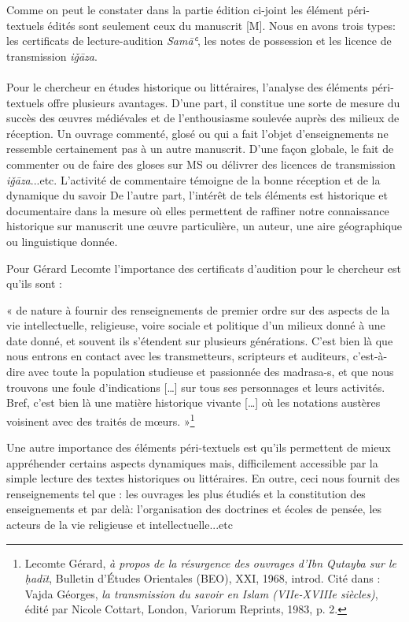 \documentclass[a4paper,12pt]{report}
\begin{document}
\begin{itemize}
\begin{enumerate}
Comme on peut le constater dans la partie édition ci-joint les élément péri-textuels édités sont seulement  ceux du manuscrit [M]. Nous en avons  trois types: les certificats de lecture-audition \textit{Samāʿ}, les notes de possession et les licence de transmission \textit{iǧāza}.  

\paragraph{}    
Pour le chercheur en études historique ou littéraires, l’analyse des éléments péri-textuels offre plusieurs avantages. D'une part, il constitue  une sorte de mesure du succès des œuvres médiévales et  de l’enthousiasme  soulevée auprès des milieux de réception. Un ouvrage commenté, glosé ou qui a fait l’objet d'enseignements  ne ressemble certainement pas à un autre manuscrit. D'une façon globale, le fait de commenter ou de faire des gloses sur MS ou délivrer des licences de transmission \textit{iǧāza}...etc. L'activité de commentaire  témoigne de la bonne réception et de la dynamique du savoir  De l’autre part, l’intérêt de tels  éléments est historique et documentaire dans la mesure où elles permettent de raffiner notre connaissance historique sur manuscrit une œuvre particulière, un auteur, une aire géographique ou linguistique donnée. 

Pour Gérard Lecomte  l’importance  des certificats d’audition  pour le chercheur  est qu’ils sont : 

« de nature à fournir des renseignements de premier ordre sur des aspects de la vie intellectuelle, religieuse, voire sociale et politique d’un milieux donné à une date donné, et souvent ils s’étendent sur plusieurs générations. C’est bien là que nous entrons en contact avec les transmetteurs, scripteurs et auditeurs, c’est-à-dire avec toute la population studieuse et passionnée des madrasa-s, et que nous trouvons une foule d’indications […] sur tous ses personnages et leurs activités. Bref, c’est bien là une matière historique vivante […]  où les notations austères voisinent avec des traités de mœurs. »\footnote{Lecomte Gérard, \textit{à propos de la résurgence des ouvrages d’Ibn Qutayba sur le ḥadīt}, Bulletin d’Études Orientales (BEO), XXI, 1968, introd. Cité dans : Vajda Géorges, \textit{la transmission du savoir en Islam (VIIe-XVIIIe siècles)}, édité par Nicole Cottart, London, Variorum Reprints, 1983, p. 2.}

Une autre importance des  éléments péri-textuels  est qu’ils permettent de mieux appréhender certains aspects  dynamiques mais, difficilement accessible  par la simple lecture des textes historiques ou littéraires. En outre, ceci nous fournit des renseignements  tel que :  les ouvrages les plus étudiés et la constitution des enseignements et par delà: l'organisation des doctrines et écoles de pensée, les acteurs de la vie religieuse et intellectuelle...etc 


\end{enumerate}
\end{itemize}
\end{document}
